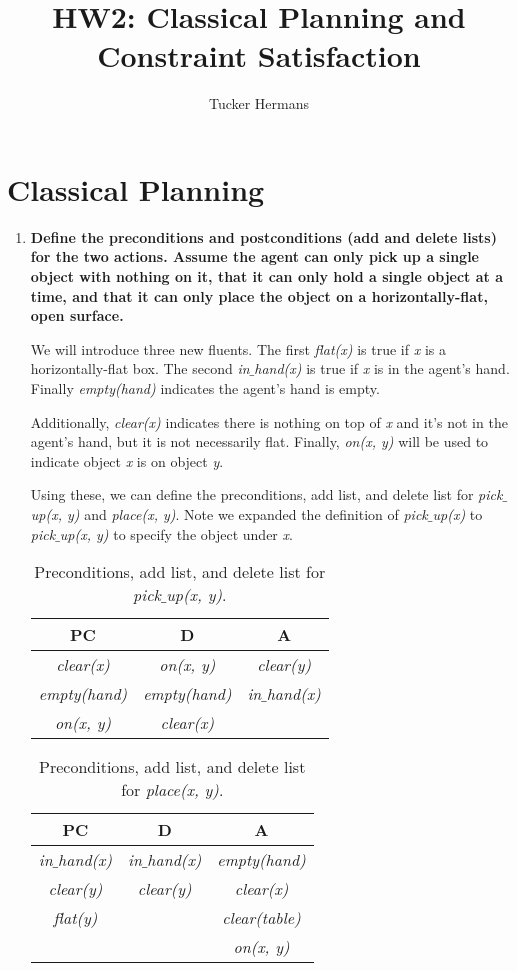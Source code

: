 \documentclass[11pt, letterpaper]{hw}
\title{HW2: Classical Planning and Constraint Satisfaction}
\institute{University of Utah}
\author{Tucker Hermans}
\begin{document}
\maketitle
\section{Classical Planning}
\begin{enumerate}
\item \textbf{Define the preconditions and postconditions (add and delete lists) for the two actions. Assume the agent can only pick up a single object with nothing on it, that it can only hold a single object at a time, and that it can only place the object on a horizontally-flat, open surface.}

We will introduce three new fluents. The first \textit{flat(x)} is true if \textit{x} is a horizontally-flat box. The second \textit{in$\_$hand(x)} is true if \textit{x} is in the agent's hand. Finally \textit{empty(hand)} indicates the agent's hand is empty.

Additionally, \textit{clear(x)} indicates there is nothing on top of \textit{x} and it's not in the agent's hand, but it is not necessarily flat. Finally, \textit{on(x, y)} will be used to indicate object \textit{x} is on object \textit{y}.

Using these, we can define the preconditions, add list, and delete list for \textit{pick$\_$up(x, y)} and \textit{place(x, y)}. Note we expanded the definition of \textit{pick$\_$up(x)} to \textit{pick$\_$up(x, y)} to specify the object under \textit{x}.

\begin{table}[H]
\centering
{\renewcommand{\arraystretch}{1.2}%
\begin{tabular}{| c | c | c |}
\hline
\textbf{PC} & \textbf{D} & \textbf{A}\\
\hline
\textit{clear(x)} & \textit{on(x, y)} & \textit{clear(y)}\\ \hline
\textit{empty(hand)} & \textit{empty(hand)} & \textit{in$\_$hand(x)}\\ \hline
\textit{on(x, y)} & \textit{clear(x)} &  \\ \hline
\end{tabular}}
\caption{Preconditions, add list, and delete list for \textit{pick$\_$up(x, y)}.}
\end{table}

\begin{table}[H]
\centering
{\renewcommand{\arraystretch}{1.2}%
\begin{tabular}{| c | c | c |}
\hline
\textbf{PC} & \textbf{D} & \textbf{A}\\
\hline
\textit{in$\_$hand(x)} & \textit{in$\_$hand(x)} & \textit{empty(hand)}\\ \hline
\textit{clear(y)} & \textit{clear(y)} & \textit{clear(x)}\\ \hline
\textit{flat(y)} &  & \textit{clear(table)} \\ \hline
 & & \textit{on(x, y)} \\ \hline
\end{tabular}}
\caption{Preconditions, add list, and delete list for \textit{place(x, y)}.}
\end{table}


\end{enumerate}
\end{document}
